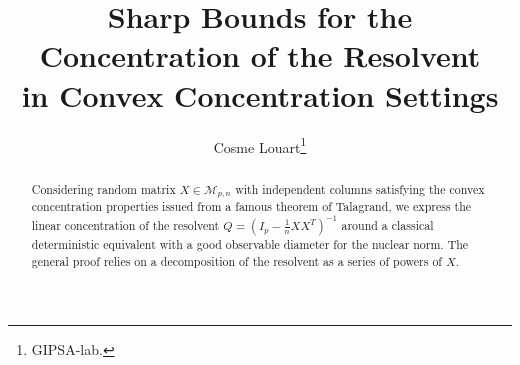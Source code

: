 \documentclass{ws-rmta}
\begin{document}
%
\catchline{}{}{}{}{}
%

\title{Sharp Bounds for the Concentration of the Resolvent \\ in Convex Concentration Settings}

\author{Cosme Louart\footnote{
GIPSA-lab.}}

\address{GIPSA-lab, 11 rue des Mathématiques,
38401 St Martin d'Hères\\ 
 }


\maketitle

\begin{history}
\end{history}

\begin{abstract}
Considering random matrix $X \in \mathcal M_{p,n}$ with independent columns satisfying the convex concentration properties issued from a famous theorem of Talagrand, we express the linear concentration of the resolvent $Q = (I_p - \frac{1}{n}XX^T) ^{-1}$ around a classical deterministic equivalent with a good observable diameter for the nuclear norm. The general proof relies on a decomposition of the resolvent as a series of powers of $X$.
\end{abstract}


\end{document}
